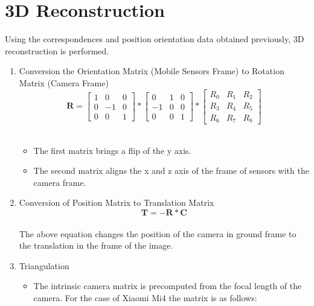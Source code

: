 \documentclass{article}
\begin{document}
	\section{3D Reconstruction}
		Using the correspondences and position orientation data obtained previously, 3D reconstruction is performed.
		\begin{enumerate}
		\item Conversion the Orientation Matrix (Mobile Sensors Frame) to Rotation Matrix (Camera Frame) \\
			  \begin{equation}
   				\mathbf{R}  = 
				    \begin{bmatrix}
				    1 & 0 & 0 \\ 0 & -1 & 0 \\ 0 & 0 & 1  
				    \end{bmatrix} *
				    \begin{bmatrix}
				    0 & 1 & 0 \\ -1 & 0 & 0 \\ 0 & 0 & 1 
				    \end{bmatrix} *
				    \begin{bmatrix}
				    R_0 & R_1 & R_2 \\ R_3 & R_4 & R_5 \\
				    R_6 & R_7 & R_8 
				    \end{bmatrix}
			  \end{equation} \\
			\begin{itemize}
			\item The first matrix brings a flip of the y axis.
			\item The second matrix aligns the x and z axis of the frame of sensors with the camera frame.
			\end{itemize}
		\item Conversion of Position Matrix to Translation Matrix \\ 
			\begin{equation}
				\mathbf{T} = - \mathbf{R} * \mathbf{C}
 			\end{equation} \\
 			The above equation changes the position of the camera in ground frame to the translation in the frame of the image.
		\item Triangulation \\
			\begin{itemize}
				\item The intrinsic camera matrix is precomputed from the focal length of the camera. For the case of Xiaomi Mi4 the matrix is as follows: \\ 

\end{itemize}
\end{enumerate}
\end{document}
